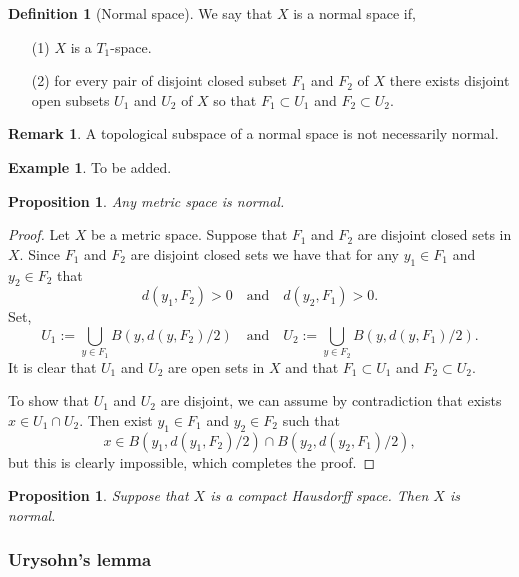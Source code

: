 \documentclass[11pt,a4paper]{article}
\theoremstyle{definition}
\newtheorem{definition}{Definition}[section]
\newtheorem{remark}{Remark}[section]
\newtheorem{example}{Example}[section]
\theoremstyle{plain}
\newtheorem{proposition}[theorem]{Proposition}
\newcommand{\tand}{\quad \text{and} \quad}
\begin{document}
  \begin{definition}[Normal space]
    We say that $X$ is a normal space if,
    \begin{itemize}
        \item[(1)] $X$ is a $T_1$-space.
        \item[(2)] for every pair of disjoint closed subset $F_1$ and $F_2$ 
          of $X$ there exists disjoint open subsets $U_1$ and $U_2$ of $X$
          so that $F_1 \subset U_1$ and $F_2 \subset U_2$.
      \end{itemize}
  \end{definition}

  \begin{remark}
    A topological subspace of a normal space is not necessarily normal.
  \end{remark}
  \begin{example}
    To be added.
  \end{example}

  \begin{proposition}
    Any metric space is normal.
  \end{proposition}
  \begin{proof}
    Let $X$ be a metric space.
    Suppose that $F_1$ and $F_2$ are disjoint closed sets in $X$.
    Since $F_1$ and $F_2$ are disjoint closed sets we have that for any
    $y_1 \in F_1$ and $y_2 \in F_2$ that
    \[
      d(y_1,F_2) > 0 \tand d(y_2,F_1) > 0.
    \]
    Set,
    \[
      U_1 := \bigcup_{y \in F_1} B(y,d(y,F_2) / 2) \tand
      U_2 := \bigcup_{y \in F_2} B(y,d(y,F_1) / 2).
    \]
    It is clear that $U_1$ and $U_2$ are open sets in $X$ and that 
    $F_1 \subset U_1$ and $F_2 \subset U_2$.

    To show that $U_1$ and $U_2$ are disjoint, we can assume by contradiction
    that exists $x \in U_1 \cap U_2$. Then exist $y_1 \in F_1$ and
    $y_2 \in F_2$ such that
    \[
      x \in B(y_1,d(y_1,F_2) / 2) \cap B(y_2,d(y_2,F_1) / 2),
    \]
    but this is clearly impossible, which completes the proof.
  \end{proof}

  \begin{proposition}
    Suppose that $X$ is a compact Hausdorff space. Then $X$ is normal.
  \end{proposition}

  \subsubsection{Urysohn’s lemma}
\end{document}
